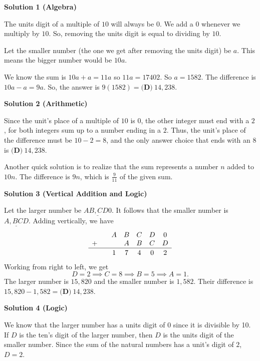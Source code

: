 \begin{enumerate}
\textbf{Solution 1 (Algebra)}

The units digit of a multiple of $10$ will always be $0$. We add a $0$ whenever we multiply by $10$. So, removing the units digit is equal to dividing by $10$.

 Let the  smaller number (the one we get after removing the units digit) be $a$. This means the bigger number would be $10a$.

 We know the sum is $10a+a = 11a$ so $11a=17402$. So $a=1582$. The difference is $10a-a = 9a$. So, the answer is $9(1582) = \boxed{\textbf{(D)} ~14{,}238}$.

 



\textbf{Solution 2 (Arithmetic)}

Since the unit's place of a multiple of $10$ is $0$, the other integer must end with a $2$, for both integers sum up to a number ending in a $2$. Thus, the unit's place of the difference must be $10-2=8$, and the only answer choice that ends with an $8$ is $\boxed{\textbf{(D)} ~14{,}238}$.

 Another quick solution is to realize that the sum represents a number $n$ added to $10n$. The difference is $9n$, which is $\frac{9}{11}$ of the given sum.

 



\textbf{Solution 3 (Vertical Addition and Logic)}

Let the larger number be $\underline{AB{,}CD0}.$ It follows that the smaller number is $\underline{A{,}BCD}.$ Adding vertically, we have 
 \[\begin{array}{cccccc}   & A & B & C & D & 0 \\ +\quad &   & A & B & C & D \\ \hline   &   &   &   &   &   \\ [-2.5ex]   & 1 & 7 & 4 & 0 & 2 \\ \end{array}\]Working from right to left, we get 
 \[D=2\implies C=8 \implies B=5 \implies A=1.\]The larger number is $15{,}820$ and the smaller number is $1{,}582.$ Their difference is $15{,}820-1{,}582=\boxed{\textbf{(D)} ~14{,}238}.$




\textbf{Solution 4 (Logic)}

We know that the larger number has a units digit of $0$ since it is divisible by 10. If $D$ is the ten's digit of the larger number, then $D$ is the units digit of the smaller number. Since the sum of the natural numbers has a unit's digit of $2$, $D=2$. 


\end{enumerate}
